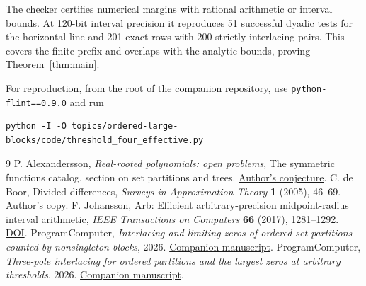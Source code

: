 \documentclass[11pt]{article}
\begin{document}
The checker certifies numerical margins with rational arithmetic or interval bounds. At 120-bit interval precision it reproduces 51 successful dyadic tests for the horizontal line and 201 exact rows with 200 strictly interlacing pairs. This covers the finite prefix and overlaps with the analytic bounds, proving Theorem~\ref{thm:main}.

For reproduction, from the root of the \href{https://github.com/ProgramComputer/open-math-research}{companion repository}, use \texttt{python-flint==0.9.0} and run
\begin{verbatim}
python -I -O topics/ordered-large-blocks/code/threshold_four_effective.py
\end{verbatim}

\begin{thebibliography}{9}
 P. Alexandersson, \emph{Real-rooted polynomials: open problems}, The symmetric functions catalog, section on set partitions and trees. \href{https://www.symmetricfunctions.com/realRootedOpenProblems.htm\#openProblemsSetPartitions}{Author's conjecture}.
 C. de Boor, Divided differences, \emph{Surveys in Approximation Theory} \textbf{1} (2005), 46--69. \href{https://pages.cs.wisc.edu/~deboor/sat/papers/2/2.pdf}{Author's copy}.
 F. Johansson, Arb: Efficient arbitrary-precision midpoint-radius interval arithmetic, \emph{IEEE Transactions on Computers} \textbf{66} (2017), 1281--1292. \href{https://doi.org/10.1109/TC.2017.2690633}{DOI}.
 ProgramComputer, \emph{Interlacing and limiting zeros of ordered set partitions counted by nonsingleton blocks}, 2026. \href{https://github.com/ProgramComputer/open-math-research/blob/main/topics/ordered-large-blocks/paper.pdf}{Companion manuscript}.
 ProgramComputer, \emph{Three-pole interlacing for ordered partitions and the largest zeros at arbitrary thresholds}, 2026. \href{https://github.com/ProgramComputer/open-math-research/blob/main/topics/ordered-large-blocks/threshold-three.pdf}{Companion manuscript}.
\end{thebibliography}
\end{document}
